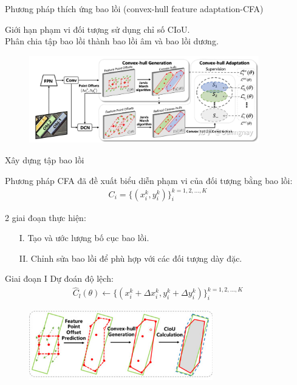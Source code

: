 \documentclass[11pt]{beamer}
\theoremstyle{definition}
\theoremstyle{plain}
\theoremstyle{plain}
\theoremstyle{remark}
\begin{document}
	\begin{frame}{Phương pháp thích ứng bao lồi (convex-hull feature adaptation-CFA)}
	 
	 Giới hạn phạm vi đối tượng sử dụng chỉ số CIoU.\\
	 Phân chia tập bao lồi thành bao lồi âm và bao lồi dương.
		\begin{figure}[htp]
			\begin{center}
				\includegraphics[width=10cm]{./Hinh_1.jpg}
			\end{center}
		\end{figure}
	\end{frame}
	\begin{frame}{Xây dựng tập bao lồi}
		
		Phương pháp CFA đã đề xuất biểu diễn phạm
		vi của đối tượng bằng bao lồi:\\
		\begin{align} \label{ptdd}
			C_i = \{(x_i^k, y_i^k )\}_i^{k=1,2,...,K}
		\end{align}
		
	
		
	\end{frame}
	\begin{frame}{2 giai đoạn thực hiện:}
		\begin{itemize}
			\item[I.] Tạo và ước lượng bố cục bao lồi.
			
			\item[II.] Chỉnh sửa bao lồi để phù hợp với các đối tượng dày đặc.
			
		\end{itemize}	
	\end{frame}
	
	
\begin{frame}{Giai đoạn I}
	Dự đoán độ lệch:
	\begin{align} \label{ptdd}
		\widehat C_l (\theta) \gets \{(x_i^k + \Delta x_i^k, y_i^k + \Delta y_i^k )\}_i^{k=1,2,...,K}
	\end{align}
\begin{figure}[ht!]
	\begin{center}
		\includegraphics[width=8cm]{./feature_point_offset_prediction.jpg}
	\end{center}
\end{figure}
\end{frame}
	
\end{document}
